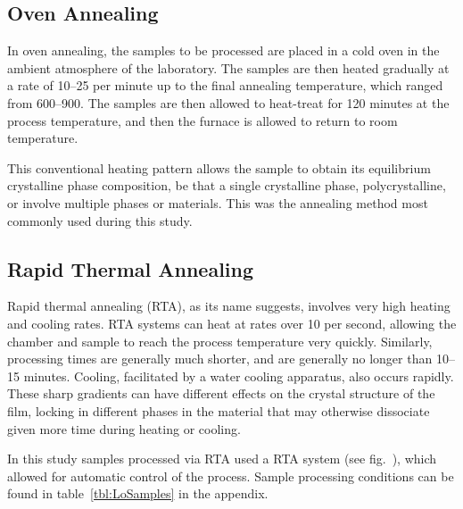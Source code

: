 
\subsection{Oven Annealing}

In oven annealing, the samples to be processed are placed in a cold oven in the ambient atmosphere of the laboratory. The samples are then heated gradually at a rate of 10--25\degC{} per minute up to the final annealing temperature, which ranged from 600--900\degC{}. The samples are then allowed to heat-treat for 120 minutes at the process temperature, and then the furnace is allowed to return to room temperature. 

This conventional heating pattern allows the sample to obtain its equilibrium crystalline phase composition, be that a single crystalline phase, polycrystalline, or involve multiple phases or materials. This was the annealing method most commonly used during this study. 


\subsection{Rapid Thermal Annealing}

Rapid thermal annealing (RTA), as its name suggests, involves very high heating and cooling rates. RTA systems can heat at rates over 10\degC{} per second, allowing the chamber and sample to reach the process temperature very quickly. Similarly, processing times are generally much shorter, and are generally no longer than 10--15 minutes. Cooling, facilitated by a water cooling apparatus, also occurs rapidly. These sharp gradients can have different effects on the crystal structure of the film, locking in different phases in the material that may otherwise dissociate given more time during heating or cooling. 

In this study samples processed via RTA used a  RTA system (see fig.~), which allowed for automatic control of the process. Sample processing conditions can be found in table~\vref{tbl:LoSamples} in the appendix. 





